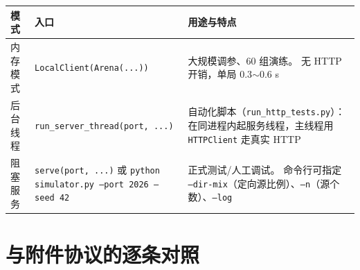 \begin{longtable}{p{3.2cm}p{4.0cm}p{7.6cm}}
\toprule
模式 & 入口 & 用途与特点 \\ \midrule
\endhead
内存模式 & \texttt{LocalClient}\newline\texttt{(Arena(...))} & 大规模调参、60 组演练。
无 HTTP 开销，单局 0.3$\sim$0.6 s \\
后台线程 & \texttt{run\_server\_\hspace{0pt}thread}\newline\texttt{(port, ...)} & 自动化脚本（\texttt{run\_http\_tests.py}）：
在同进程内起服务线程，主线程用 \texttt{HTTPClient} 走真实 HTTP \\
阻塞服务 & \texttt{serve(port, ...)} 或
\texttt{python simulator.py --port 2026 --seed 42} & 正式测试/人工调试。
命令行可指定 \texttt{--dir-mix}（定向源比例）、\texttt{--n}（源个数）、\texttt{--log} \\
\bottomrule
\end{longtable}

\section{与附件协议的逐条对照}

